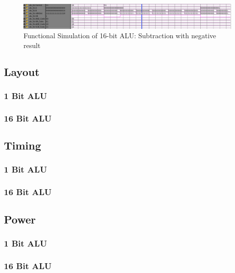 \documentclass[11pt]{article}
\begin{document}
	
			\begin{figure}[H]
				\centering
				\includegraphics[width=0.7\linewidth]{"Pictures/16 Bit ALU Sub Neg"}
				\caption{Functional Simulation of 16-bit ALU: Subtraction with negative result}
				\label{fig:16-bit-alu-sub-neg}
			\end{figure}
		
		
	\subsection{Layout}
	
		\subsubsection{1 Bit ALU}
		
			
	
		\subsubsection{16 Bit ALU}
	
	\subsection{Timing}
	
		\subsubsection{1 Bit ALU}
		
		\subsubsection{16 Bit ALU}
	
	\subsection{Power}
		
		\subsubsection{1 Bit ALU}
		
		\subsubsection{16 Bit ALU}
\end{document}
